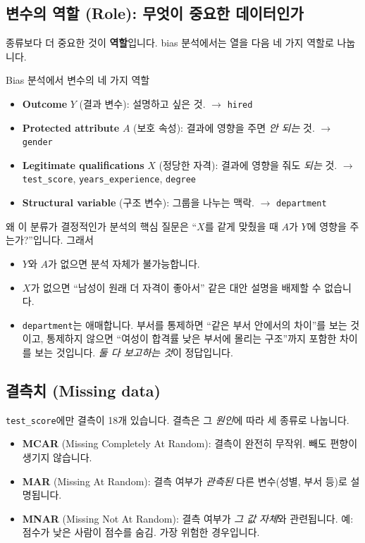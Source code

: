 \documentclass[11pt,a4paper]{article}
\newcommand{\term}[1]{\textbf{#1}}
\newcommand{\code}[1]{\texttt{#1}}
\begin{document}
\subsection{변수의 역할 (Role): 무엇이 중요한 데이터인가}
종류보다 더 중요한 것이 \textbf{역할}입니다. bias 분석에서는 열을 다음 네 가지 역할로 나눕니다.

\begin{defbox}{Bias 분석에서 변수의 네 가지 역할}
\begin{itemize}
\item \term{Outcome} $Y$ (결과 변수): 설명하고 싶은 것. $\to$ \code{hired}
\item \term{Protected attribute} $A$ (보호 속성): 결과에 영향을 주면 \emph{안 되는} 것. $\to$ \code{gender}
\item \term{Legitimate qualifications} $X$ (정당한 자격): 결과에 영향을 줘도 \emph{되는} 것. $\to$ \code{test\_score}, \code{years\_experience}, \code{degree}
\item \term{Structural variable} (구조 변수): 그룹을 나누는 맥락. $\to$ \code{department}
\end{itemize}
\end{defbox}

\begin{whybox}{왜 이 분류가 결정적인가}
분석의 핵심 질문은 ``$X$를 같게 맞췄을 때 $A$가 $Y$에 영향을 주는가?''입니다. 그래서
\begin{itemize}
\item $Y$와 $A$가 없으면 분석 자체가 불가능합니다.
\item $X$가 없으면 ``남성이 원래 더 자격이 좋아서'' 같은 대안 설명을 배제할 수 없습니다.
\item \code{department}는 애매합니다. 부서를 통제하면 ``같은 부서 안에서의 차이''를 보는 것이고, 통제하지 않으면 ``여성이 합격률 낮은 부서에 몰리는 구조''까지 포함한 차이를 보는 것입니다. \emph{둘 다 보고하는 것}이 정답입니다.
\end{itemize}
\end{whybox}

\subsection{결측치 (Missing data)}
\code{test\_score}에만 결측이 18개 있습니다. 결측은 그 \emph{원인}에 따라 세 종류로 나눕니다.
\begin{itemize}
\item \term{MCAR} (Missing Completely At Random): 결측이 완전히 무작위. 빼도 편향이 생기지 않습니다.
\item \term{MAR} (Missing At Random): 결측 여부가 \emph{관측된} 다른 변수(성별, 부서 등)로 설명됩니다.
\item \term{MNAR} (Missing Not At Random): 결측 여부가 \emph{그 값 자체}와 관련됩니다. 예: 점수가 낮은 사람이 점수를 숨김. 가장 위험한 경우입니다.
\end{itemize}
\end{document}
